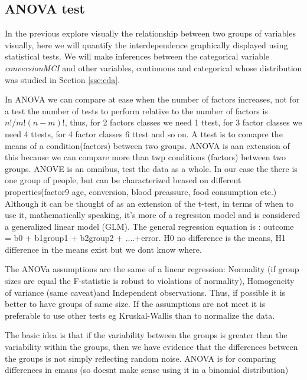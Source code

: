 \documentclass[11pt]{article}
\theoremstyle{definition}
\theoremstyle{remark}
\begin{document}
\subsection{ANOVA test}
\label{sse:res}
In the previous explore visually the relationship between two groups of variables visually, here we will quantify the interdependence graphically displayed using statistical tests. We will make inferences between the categorical variable \emph{conversionMCI} and other variables, continuous and categorical whose distribution was studied in Section \ref{sse:eda}.

In ANOVA we can compare at ease when the number of factors increases, not for a test the number of tests to perform relative to the number of factors is $n!/m!(n-m)!$, thus, for 2 factors classes we need 1 ttest, for 3 factor classes we need 4 ttests, for 4 factor classes 6 ttest and so on.
A ttest is to comapre the means of a condition(factors) between two groups. ANOVA is aan extension of this because we can compare more than twp conditions (factors) between two groups. ANOVE is an omnibus, test the data as a whole.
In our case the there is one group of people, but can be characterized beased on different properties(factor9 age, conversion, blood preassure, food consumption etc.)
Although it can be thought of as an extension of the t-test, in terms of when to use it, mathematically speaking, it’s more of a regression model and is considered a generalized linear model (GLM). The general regression equation is : outcome = b0 + b1group1 + b2group2 + ....+error.
H0 no difference is the means, H1 difference in the means exist but we dont know where.

The ANOVa assumptions are the same of a linear regression: Normality (if group sizes are equal the F-statistic is robust to violations of normality), Homogeneity of variance (same caveat)and Independent observations. Thus, if possible it is better to have groups of same size. If the assumptions are not meet it is preferable to use other tests eg Kruskal-Wallis than to normalize the data.

The basic idea is that if the variability between the groups is greater than the variability within the groups, then we have evidence that the differences between the groups is not simply reflecting random noise.
ANOVA is for comparing differences in emans (so doesnt make sense using it in a binomial distribution)
\end{document}
